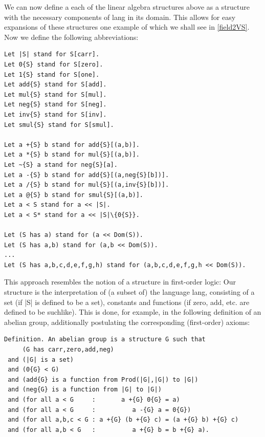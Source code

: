 \documentclass[11pt]{article}
\begin{document}
We can now define a each of the linear algebra structures above as a structure with the necessary components of {\ftl lang} in its domain. This allows for easy expansions of these structures one example of which we shall see in \ref{field2VS}. Now we define the following abbreviations:
\begin{lstlisting}
Let |S| stand for S[carr].
Let 0{S} stand for S[zero].
Let 1{S} stand for S[one].
Let add{S} stand for S[add].
Let mul{S} stand for S[mul].
Let neg{S} stand for S[neg].
Let inv{S} stand for S[inv].
Let smul{S} stand for S[smul].

Let a +{S} b stand for add{S}[(a,b)].
Let a *{S} b stand for mul{S}[(a,b)].
Let ~{S} a stand for neg{S}[a].
Let a -{S} b stand for add{S}[(a,neg{S}[b])].
Let a /{S} b stand for mul{S}[(a,inv{S}[b])].
Let a @{S} b stand for smul{S}[(a,b)].
Let a < S stand for a << |S|.
Let a < S* stand for a << |S|\{0{S}}.

Let (S has a) stand for (a << Dom(S)).
Let (S has a,b) stand for (a,b << Dom(S)).
...
Let (S has a,b,c,d,e,f,g,h) stand for (a,b,c,d,e,f,g,h << Dom(S)).
\end{lstlisting}

This approach resembles the notion of a structure in first-order logic: Our {\ftl structure} is the interpretation of (a subset of) the language {\ftl lang}, consisting of a set (if {\ftl |S|} is defined to be a set), constants and functions (if {\ftl zero}, {\ftl add}, etc. are defined to be suchlike).
This is done, for example, in the following definition of an abelian group, additionally postulating the corresponding (first-order) axioms:
\begin{lstlisting}
Definition. An abelian group is a structure G such that
     (G has carr,zero,add,neg)
 and (|G| is a set)
 and (0{G} < G)
 and (add{G} is a function from Prod(|G|,|G|) to |G|)
 and (neg{G} is a function from |G| to |G|)
 and (for all a < G     :       a +{G} 0{G} = a)
 and (for all a < G     :          a -{G} a = 0{G})
 and (for all a,b,c < G : a +{G} (b +{G} c) = (a +{G} b) +{G} c)
 and (for all a,b < G   :          a +{G} b = b +{G} a). 
\end{lstlisting}
\end{document}
